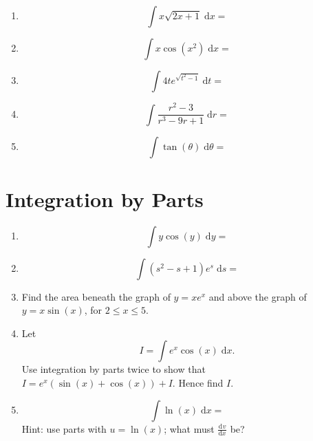 \documentclass{article}
\newcommand{\deriv}[3][]{\frac{\mathrm{d}^{#1}#2}{\mathrm{d}#3^{#1}}}
\newcommand{\diff}{\;\mathrm{d}}
\begin{document}
\begin{enumerate}
	\item \[\int x\sqrt{2x+1}\diff x =\]
	\item \[\int x\cos(x^2)\diff x =\]
	\item \[\int 4t e^{\sqrt{t^2-1}}\diff t =\]
	\item \[\int \frac{r^2-3}{r^3-9r+1}\diff r =\]
	\item \[\int \tan(\theta)\diff \theta=\]
\end{enumerate}



\clearpage

\section{Integration by Parts}

\begin{enumerate}
	\item \[\int y\cos(y)\diff y=\]
	\item \[\int (s^2-s+1)e^s\diff s =\]
	\item Find the area beneath the graph of $y=xe^x$ and above the graph of $y=x\sin(x)$, for $2\leq x \leq 5$.
	\item Let
		\[I=\int e^x\cos(x)\diff x.\]
		Use integration by parts twice to show that $I=e^x(\sin(x)+\cos(x))+I$. Hence find $I$.
	\item \[\int \ln(x)\diff x=\]
	Hint: use parts with $u=\ln(x)$; what must $\deriv{v}{x}$ be?
\end{enumerate}
\end{document}
